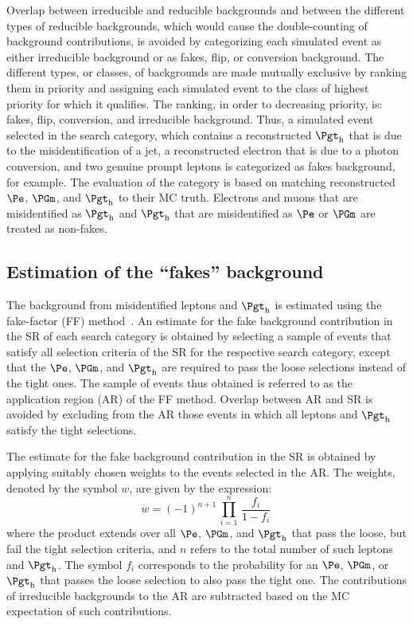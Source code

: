 Overlap between irreducible and reducible backgrounds and between the different types of reducible backgrounds,
which would cause the double-counting of background contributions,
is avoided by categorizing each simulated event as either irreducible background or as fakes, flip, or conversion background.
The different types, or classes, of backgrounds are made mutually exclusive by ranking them in priority and assigning each simulated event to the class of highest priority for which it qualifies.
The ranking, in order to decreasing priority, is: fakes, flip, conversion, and irreducible background.
Thus, a simulated event selected in the \threeLeptonOneTau search category, which contains a reconstructed $\tauh$ that is due to the misidentification of a jet,
a reconstructed electron that is due to a photon conversion, and two genuine prompt leptons is categorized as fakes background, for example.
The evaluation of the category is based on matching reconstructed $\Pe$, $\PGm$, and $\tauh$ to their MC truth.
Electrons and muons that are misidentified as $\tauh$ and $\tauh$ that are misidentified as $\Pe$ or $\PGm$ are treated as non-fakes.


\subsection{Estimation of the ``fakes'' background}
\label{sec:backgroundEstimation_fakes}

The background from misidentified leptons and $\tauh$ is estimated using the fake-factor (FF) method~\cite{Sirunyan:2018shy}.
An estimate for the fake background contribution in the SR of each search category is obtained
by selecting a sample of events that satisfy all selection criteria of the SR for the respective search category,
except that the $\Pe$, $\PGm$, and $\tauh$ are required to pass the loose selections instead of the tight ones.
The sample of events thus obtained is referred to as the application region (AR) of the FF method.
Overlap between AR and SR is avoided by excluding from the AR those events in which all leptons and $\tauh$ satisfy the tight selections.

The estimate for the fake background contribution in the SR is obtained by applying suitably chosen weights to the events selected in the AR.
The weights, denoted by the symbol $w$, are given by the expression:
\begin{equation}
w = (-1)^{n+1} \, \prod_{i=1}^{n} \, \frac{f_{i}}{1 - f_{i}}\,
\label{eq:FF_weights}
\end{equation}
where the product extends over all $\Pe$, $\PGm$, and $\tauh$
that pass the loose, but fail the tight selection criteria,
and $n$ refers to the total number of such leptons and $\tauh$.
The symbol $f_{i}$ corresponds to the probability for an $\Pe$, $\PGm$, or $\tauh$ that passes the loose selection to also pass the tight one.
The contributions of irreducible backgrounds to the AR are subtracted based on the MC expectation of such contributions.

